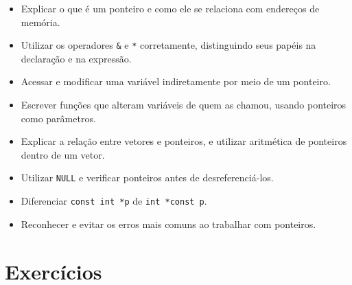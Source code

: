 \begin{objetivos}
\begin{itemize}
    \item Explicar o que é um ponteiro e como ele se relaciona com endereços de memória.
    \item Utilizar os operadores \texttt{\&} e \texttt{*} corretamente, distinguindo seus papéis na declaração e na expressão.
    \item Acessar e modificar uma variável indiretamente por meio de um ponteiro.
    \item Escrever funções que alteram variáveis de quem as chamou, usando ponteiros como parâmetros.
    \item Explicar a relação entre vetores e ponteiros, e utilizar aritmética de ponteiros dentro de um vetor.
    \item Utilizar \texttt{NULL} e verificar ponteiros antes de desreferenciá-los.
    \item Diferenciar \texttt{const int *p} de \texttt{int *const p}.
    \item Reconhecer e evitar os erros mais comuns ao trabalhar com ponteiros.
\end{itemize}
\end{objetivos}

\section*{Exercícios}

